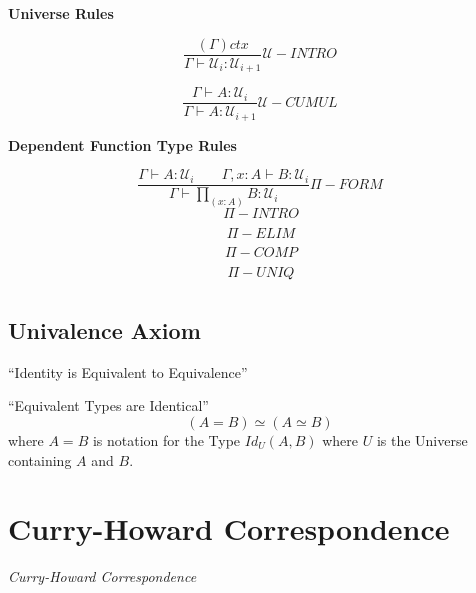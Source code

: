 \textbf{Universe Rules}

\[
  {
    \frac
    {(\Gamma) ctx}
    {\Gamma \vdash \mathcal{U}_i : \mathcal{U}_{i+1}}
  } \mathcal{U}-INTRO
\]

\[
  {
    \frac
    {\Gamma \vdash A : \mathcal{U}_i}
    {\Gamma \vdash A : \mathcal{U}_{i+1}}
  } \mathcal{U}-CUMUL
\]



\textbf{Dependent Function Type Rules}

\[
  {
    \frac
    {\Gamma \vdash A : \mathcal{U}_i \;\;\;\;\;\;\;
    \Gamma,x:A \vdash B : \mathcal{U}_i}
    {\Gamma \vdash \prod_{(x:A)} B : \mathcal{U}_i}
  } \Pi-FORM
\]\[
  {
    \frac
    {}
    {}
  } \Pi-INTRO
\]\[
  {
    \frac
    {}
    {}
  } \Pi-ELIM
\]\[
  {
    \frac
    {}
    {}
  } \Pi-COMP
\]\[
  {
    \frac
    {}
    {}
  } \Pi-UNIQ
\]



\subsection{Univalence Axiom}\label{sec:univalence_axiom}

``Identity is Equivalent to Equivalence''

``Equivalent Types are Identical''
\[
  (A = B) \simeq (A \simeq B)
\]
where $A = B$ is notation for the Type $Id_U(A,B)$ where $U$ is the
Universe containing $A$ and $B$.



\section{Curry-Howard Correspondence}\label{sec:curry_howard}

\emph{Curry-Howard Correspondence}

